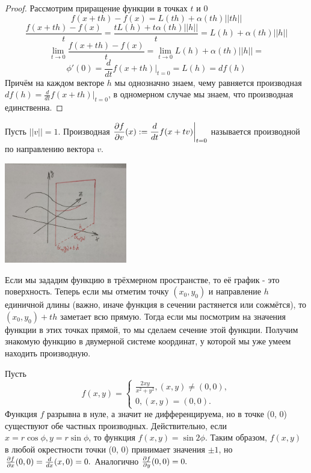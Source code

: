     \begin{proof}
    	Рассмотрим приращение функции в точках $t$ и $0$
    	\[ f(x + th) - f(x) = L(th) + \alpha(th) ||th|| \]
    	\[ \frac{f(x + th) - f(x)}{t} = \frac{tL(h) + t \alpha(th) ||h||}{t} = L(h) + \alpha(th) ||h|| \]
    	\[ \lim_{t \to 0} \frac{f(x + th) - f(x)}{t} = \lim_{t \to 0} L(h) + \alpha(th) ||h|| =  \]
    	\[ \phi'(0) = \frac{d}{dt} f(x + th) \bigg|_{t = 0} = L(h) = df(h) \]
    	Причём на каждом векторе $h$ мы однозначно знаем, чему равняется производная $df(h) = \frac{d}{dt} f(x + th) \bigg|_{t = 0}$, в одномерном случае мы знаем, что производная единственна.
    \end{proof}
    
    \begin{definition}
    	Пусть $||v|| = 1$. Производная $\displaystyle \frac{\partial f}{\partial v} (x) := \frac{d}{dt} f(x + tv) \bigg|_{t = 0}$ называется производной по направлению вектора $v$.
    \end{definition}
    
    \begin{center}
    	\includegraphics[width=0.4\textwidth]{img/lecture36/deriv}
    \end{center}
    
    Если мы зададим функцию в трёхмерном пространстве, то её график - это поверхность. Теперь если мы отметим точку $(x_0, y_0)$ и направление $h$ единичной длины (важно, иначе функция в сечении растянется или сожмётся), то $(x_0, y_0) + th$ заметает всю прямую. Тогда если мы посмотрим на значения функции в этих точках прямой, то мы сделаем сечение этой функции. Получим знакомую функцию в двумерной системе координат, у которой мы уже умеем находить производную. 
    
    \begin{example}
    	Пусть
    	\[ \displaystyle f(x, y) = \left\{{
    		\begin{matrix}
    			\frac{2xy}{x^2 + y^2}, (x, y) \neq (0, 0),  \\
    			0, (x, y) = (0, 0).
    		\end{matrix}
    	}\right. \]
    	Функция $f$ разрывна в нуле, а значит не дифференцируема, но в точке (0, 0) существуют обе частных производных. Действительно, если $x = r \cos{\phi}, y = r \sin{\phi}$, то функция $f(x, y) = \sin{2\phi}$.
    	Таким образом, $f(x, y)$ в любой окрестности точки (0, 0) принимает значения $\pm 1$, но $\frac{\partial f}{\partial x} (0, 0) = \frac{d}{dx} (x, 0) = 0.$ Аналогично $\frac{\partial f}{\partial y} (0, 0) = 0.$
    \end{example}
    
